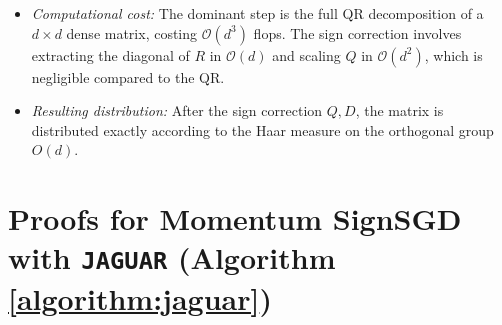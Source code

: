 \documentclass{article}
\theoremstyle{plain}
\theoremstyle{definition}
\theoremstyle{remark}
\begin{document}
\begin{itemize}
  \item \emph{Computational cost:}  
    The dominant step is the full QR decomposition of a $d\times d$ dense matrix, costing $\mathcal{O}(d^3)$ flops.  
    The sign correction involves extracting the diagonal of $R$ in $\mathcal{O}(d)$ and scaling $Q$ in $\mathcal{O}(d^2)$, which is negligible compared to the QR.
  \item \emph{Resulting distribution:}  
    After the sign correction $Q,D$, the matrix is distributed exactly according to the Haar measure on the orthogonal group $O(d)$.  
\end{itemize}

\section{Proofs for Momentum SignSGD with \texttt{JAGUAR} (Algorithm \ref{algorithm:jaguar})}
\end{document}
